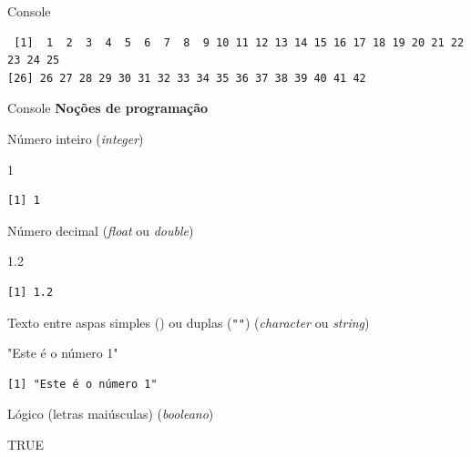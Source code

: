 \documentclass[
  ignorenonframetext,
]{beamer}
\newenvironment{Shaded}{\begin{snugshade}}{\end{snugshade}}
\newcommand{\ConstantTok}[1]{\textcolor[rgb]{0.56,0.35,0.01}{#1}}
\newcommand{\DecValTok}[1]{\textcolor[rgb]{0.68,0.00,0.00}{#1}}
\newcommand{\FloatTok}[1]{\textcolor[rgb]{0.68,0.00,0.00}{#1}}
\newcommand{\StringTok}[1]{\textcolor[rgb]{0.13,0.47,0.30}{#1}}
\begin{document}
\begin{frame}[fragile]{}
\begin{block}{Console}
\begin{verbatim}
 [1]  1  2  3  4  5  6  7  8  9 10 11 12 13 14 15 16 17 18 19 20 21 22 23 24 25
[26] 26 27 28 29 30 31 32 33 34 35 36 37 38 39 40 41 42
\end{verbatim}
\end{block}

\begin{block}{Console}
\protect\hypertarget{console-3}{}
\textbf{Noções de programação}

Número inteiro (\emph{integer})

\begin{Shaded}
\begin{Highlighting}[]
\DecValTok{1}
\end{Highlighting}
\end{Shaded}

\begin{verbatim}
[1] 1
\end{verbatim}

\pause

Número decimal (\emph{float} ou \emph{double})

\begin{Shaded}
\begin{Highlighting}[]
\FloatTok{1.2}
\end{Highlighting}
\end{Shaded}

\begin{verbatim}
[1] 1.2
\end{verbatim}

\pause

Texto entre aspas simples
(\texttt{\textquotesingle{}\textquotesingle{}}) ou duplas (\texttt{""})
(\emph{character} ou \emph{string})

\begin{Shaded}
\begin{Highlighting}[]
\StringTok{"Este é o número 1"}
\end{Highlighting}
\end{Shaded}

\begin{verbatim}
[1] "Este é o número 1"
\end{verbatim}

\pause

Lógico (letras maiúsculas) (\emph{booleano})

\begin{Shaded}
\begin{Highlighting}[]
\ConstantTok{TRUE}
\end{Highlighting}
\end{Shaded}


\end{block}
\end{frame}
\end{document}
